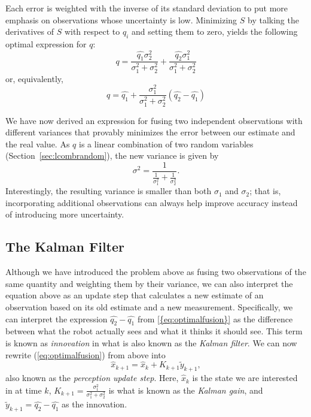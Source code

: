 Each error is weighted  with the inverse of its standard deviation to put more emphasis on observations whose uncertainty is low. Minimizing  $S$ by talking the derivatives of $S$ with respect to $\hat{q}_i$ and setting them to zero, yields the following optimal expression for $q$:
\begin{equation}
q=\frac{\hat{q_1}\sigma_2^2}{\sigma_1^2+\sigma_2^2}+\frac{\hat{q_2}\sigma_1^2}{\sigma_1^2+\sigma_2^2}
\end{equation}
or, equivalently,
\begin{equation}
q=\hat{q_1}+\frac{\sigma_1^2}{\sigma_1^2+\sigma_2^2}(\hat{q_2}-\hat{q_1})\label{eq:optimalfusion}
\end{equation}

We have now derived an expression for fusing two independent observations with different variances that provably minimizes the error between our estimate and the real value. As $q$ is a linear combination of two random variables (Section~\ref{sec:lcombrandom}), the new variance is given by
\begin{equation}
\sigma^2=\frac{1}{\frac{1}{\sigma_1^2}+\frac{1}{\sigma_2^2}} .
\end{equation}
Interestingly, the resulting variance is smaller than both $\sigma_1$ and $\sigma_2$; that is, incorporating additional observations can always help improve accuracy instead of introducing more uncertainty.

\subsection{The Kalman Filter}
Although we have introduced the problem above as fusing two observations of the same quantity and weighting them by their variance, we can also interpret the equation above as an update step that calculates a new estimate of an observation based on its old estimate and a new measurement. Specifically, we can interpret the expression $\hat{q_2}-\hat{q_1}$ from \cref{{eq:optimalfusion}} as the difference between what the robot actually sees and what it thinks it should see. This term is known as \textsl{innovation} in what is also known as the \emph{Kalman filter}. We can now
rewrite (\ref{eq:optimalfusion}) from above into
\begin{equation}
\hat{x}_{k+1}=\hat{x}_k+K_{k+1}\tilde{y}_{k+1} \label{eq:kalmanperceptionstep},
\end{equation}
also known as the \emph{perception update step}.
Here, $ \hat{x}_k$ is the state we are interested in at time $ k$, $ K_{k+1}=\frac{\sigma_1^2}{\sigma_1^2+\sigma_2^2}$ is what is known as the \emph{Kalman gain}, and $ \tilde{y}_{k+1}=\hat{q_2}-\hat{q_1}$  as the innovation.

